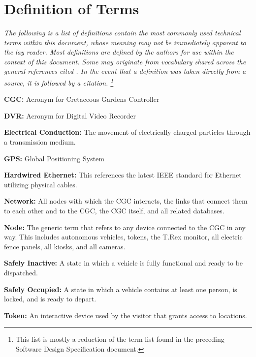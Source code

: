 \documentclass[12pt]{article}
\begin{document}
\section{Definition of Terms} \label{defs}
\paragraph{} \textit{The following is a list of definitions contain the most commonly used 
technical terms within this document, whose meaning may not be immediately apparent to the 
lay reader. Most definitions are defined by the authors for use within the context of this 
document. Some may originate from vocabulary shared across the general references cited \nocite{*}. 
In the event that a definition was taken directly from a source, it is followed by a citation.
\footnote{This list is mostly a reduction of the term list found in the preceding Software 
Design Specification document.}}

\begin{list}{}{}
    \item \textbf{CGC:} Acronym for Cretaceous Gardens Controller 
    \item \textbf{DVR:} Acronym for Digital Video Recorder
    \item \textbf{Electrical Conduction:} The movement of electrically charged particles through a transmission medium.
    \item \textbf{GPS:} Global Positioning System 
    \item \textbf{Hardwired Ethernet:} This references the latest IEEE standard for Ethernet utilizing physical cables.
    \item \textbf{Network:} All nodes with which the CGC interacts, the links that connect them to each other and to the CGC, the CGC itself, and all related databases.
    \item \textbf{Node:} The generic term that refers to any device connected to the CGC in any way. This includes autonomous vehicles, tokens, the T.Rex monitor, all electric fence panels, all kiosks, and all cameras.
    \item \textbf{Safely Inactive:} A state in which a vehicle is fully functional and ready to be dispatched.
    \item \textbf{Safely Occupied:} A state in which a vehicle contains at least one person, is locked, and is ready to depart.
    \item \textbf{Token:} An interactive device used by the visitor that grants access to locations.
\end{list}
\pagebreak

\end{document}
